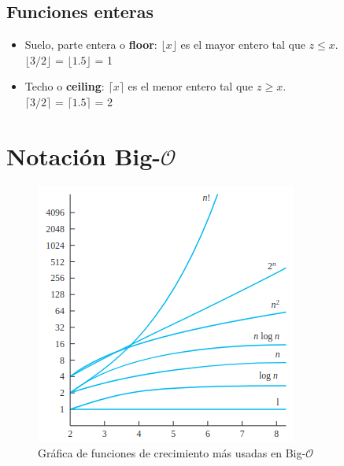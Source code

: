 \documentclass{article}
\begin{document}
\subsection{Funciones enteras}
\begin{itemize}
    \item Suelo, parte entera o \textbf{floor}: $\lfloor x \rfloor$ es el mayor entero tal que $z \leq x$. \\
    $\lfloor 3/2 \rfloor$ = $\lfloor 1.5 \rfloor$ = 1
    \item Techo o \textbf{ceiling}: $\lceil x \rceil$ es el menor entero tal que $z \geq x$. \\
    $\lceil 3/2 \rceil$ = $\lceil 1.5 \rceil$ = 2
    
\end{itemize}

\newpage

\section{Notación Big-$\mathcal{O}$}

\begin{figure}
    \centering
    \includegraphics[width=\linewidth]{img-t1/img_036_28.png}
    \caption{Gráfica de funciones de crecimiento más usadas en Big-$\mathcal{O}$}
\end{figure}
\end{document}
